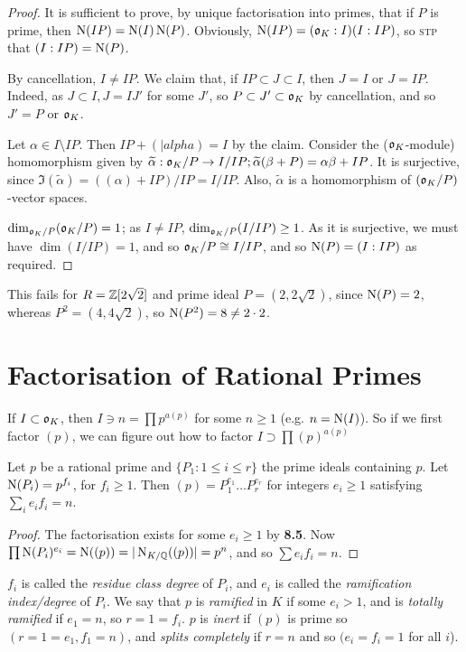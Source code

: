 \documentclass[10pt,a4paper]{article}
\begin{document}
\begin{proof}
It is sufficient to prove, by unique factorisation into primes, that if $P$ is prime, then $\operatorname{N}(IP)=\operatorname{N}(I)\operatorname{N}(P)$. Obviously, $\operatorname{N}(IP) = (\mathfrak{o}_K : I)(I:IP)$, so \textsc{stp} that $(I:IP) = \operatorname{N}(P)$. 

By cancellation, $I \neq IP$. We claim that, if $IP \subset J \subset I$, then $J = I$ or $J = IP$. Indeed, as $J \subset I, J = IJ'$ for some $J'$, so $P \subset J' \subset \mathfrak{o}_K$ by cancellation, and so $J' = P$ or $\mathfrak{o}_K$.

Let $\alpha \in I \setminus IP$. Then $IP + (|alpha) = I$ by the claim. Consider the ($\mathfrak{o}_K$-module) homomorphism given by $\widetilde{\alpha}: \mathfrak{o}_K/P \to I/IP; \widetilde{\alpha}(\beta+P) = \alpha\beta +IP$. It is surjective, since $\Im(\tilde{\alpha}) = ((\alpha) + IP)/IP = I/IP$. Also, $\tilde{\alpha}$ is a homomorphism of $(\mathfrak{o}_K/P)$-vector spaces.

$\dim_{\mathfrak{o}_K/P} (\mathfrak{o}_K/P) = 1$; as $I \neq IP$, $\dim_{\mathfrak{o}_K/P} ( I/IP) \geq 1$. As it is surjective, we must have $\dim(I/IP) = 1$, and so $\mathfrak{o}_K/P \cong I/IP$, and so $\operatorname{N}(P) = (I:IP)$ as required.
\end{proof}

This fails for $R = \mathbb{Z}[2\sqrt{2}]$ and prime ideal $P = (2, 2\sqrt{2})$, since $\operatorname{N}(P) = 2$, whereas $P^2 = (4, 4\sqrt{2})$, so $\operatorname{N}(P^2) = 8 \neq 2 \cdot 2$.

\section{Factorisation of Rational Primes}
If $I \subset \mathfrak{o}_K$, then $I \ni n = \prod p^{a(p)}$ for some $n \geq 1$ (e.g. $n = \operatorname{N}(I)$). So if we first factor $(p)$, we can figure out how to factor $I \supset \prod (p)^{a(p)}$

\begin{theorem}
Let $p$ be a rational prime and $\{P_1 : 1 \le i \leq r\}$ the prime ideals containing $p$. Let $\operatorname{N}(P_i) = p^{f_i}$, for $f_i \geq 1$. Then $(p) = P_1^{e_1} \ldots P_r^{e_r}$ for integers $e_i \geq 1$ satisfying $\sum_i e_i f_i = n$.
\end{theorem}
\begin{proof}
The factorisation exists for some $e_i \geq 1$ by \textbf{8.5}. Now $\prod \operatorname{N}(P_i)^{e_i} = \operatorname{N}((p)) = |\operatorname{N}_{K/\mathbb{Q}}((p))| = p^n$, and so $\sum e_i f_i = n$.
\end{proof}
$f_i$ is called the \emph{residue class degree} of $P_i$, and $e_i$ is called the \emph{ramification index/degree} of $P_i$. We say that $p$ is \emph{ramified} in $K$ if some $e_i >1$, and is \emph{totally ramified} if $e_1 = n$, so $r = 1 = f_i$. $p$ is \emph{inert} if $(p)$ is prime so $(r = 1 = e_1, f_1 = n)$, and \emph{splits completely} if $r = n$ and so $(e_i = f_i = 1$ for all $i$).
\end{document}
